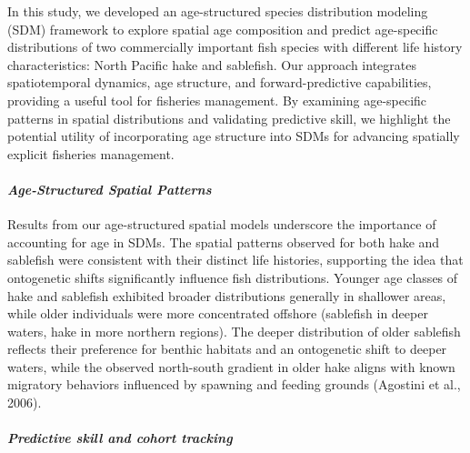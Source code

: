 \documentclass[
]{article}
\let\oldparagraph\paragraph
\renewcommand{\paragraph}[1]{\oldparagraph{#1}\mbox{}}
\begin{document}
In this study, we developed an age-structured species distribution
modeling (SDM) framework to explore spatial age composition and predict
age-specific distributions of two commercially important fish species
with different life history characteristics: North Pacific hake and
sablefish. Our approach integrates spatiotemporal dynamics, age
structure, and forward-predictive capabilities, providing a useful tool
for fisheries management. By examining age-specific patterns in spatial
distributions and validating predictive skill, we highlight the
potential utility of incorporating age structure into SDMs for advancing
spatially explicit fisheries management.

\hypertarget{age-structured-spatial-patterns}{%
\paragraph{\texorpdfstring{\emph{Age-Structured Spatial
Patterns}}{Age-Structured Spatial Patterns}}\label{age-structured-spatial-patterns}}

Results from our age-structured spatial models underscore the importance
of accounting for age in SDMs. The spatial patterns observed for both
hake and sablefish were consistent with their distinct life histories,
supporting the idea that ontogenetic shifts significantly influence fish
distributions. Younger age classes of hake and sablefish exhibited
broader distributions generally in shallower areas, while older
individuals were more concentrated offshore (sablefish in deeper waters,
hake in more northern regions). The deeper distribution of older
sablefish reflects their preference for benthic habitats and an
ontogenetic shift to deeper waters, while the observed north-south
gradient in older hake aligns with known migratory behaviors influenced
by spawning and feeding grounds (Agostini et al., 2006).

\hypertarget{predictive-skill-and-cohort-tracking}{%
\paragraph{\texorpdfstring{\emph{Predictive skill and cohort
tracking}}{Predictive skill and cohort tracking}}\label{predictive-skill-and-cohort-tracking}}
\end{document}
